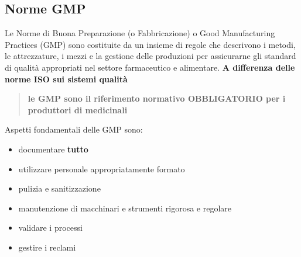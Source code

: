 \documentclass[a4paper]{article}
\begin{document}
\subsection{Norme GMP}
Le Norme di Buona Preparazione (o Fabbricazione) o Good Manufacturing Practices (GMP) sono costituite da
un insieme di regole che descrivono i metodi, le attrezzature, i mezzi e la gestione delle produzioni per
assicurarne gli standard di qualità appropriati nel settore farmaceutico e alimentare. \textbf{A differenza delle norme
ISO sui sistemi qualità}
\begin{quote}
    \centering
    \textbf{le GMP sono il riferimento normativo OBBLIGATORIO per i produttori di medicinali}
\end{quote}
Aspetti fondamentali delle GMP sono:
\begin{itemize}
    \item documentare \textbf{tutto}
    \item utilizzare personale appropriatamente formato
    \item pulizia e sanitizzazione
    \item manutenzione di macchinari e strumenti rigorosa e regolare
    \item validare i processi
    \item gestire i reclami
\end{itemize}
\end{document}
